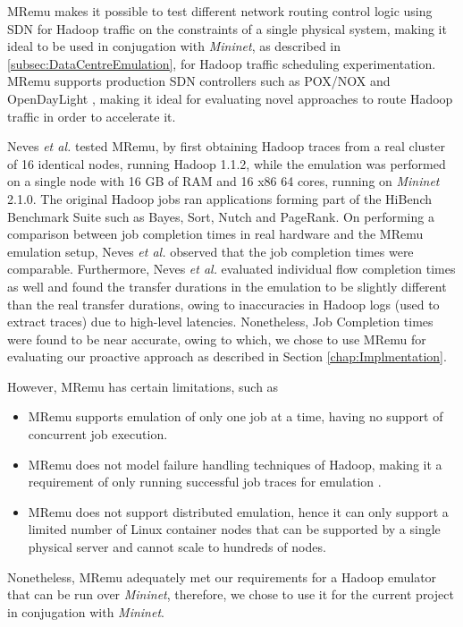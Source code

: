 MRemu makes it possible to test different network routing control logic using SDN for Hadoop traffic on the constraints of a single physical system, making it ideal to be used in conjugation with \textit{Mininet}, as described in \ref{subsec:DataCentreEmulation}, for Hadoop traffic scheduling experimentation. MRemu supports production SDN controllers such as POX/NOX \cite{gude2008nox} and OpenDayLight \cite{ODL2016}, making it ideal for evaluating novel approaches to route Hadoop traffic in order to accelerate it. 

Neves \textit{et al.}  \cite{neves2015mremu} tested MRemu, by first obtaining Hadoop traces from a real cluster of 16 identical nodes, running Hadoop 1.1.2, while the emulation was performed on a single node with 16 GB of RAM and 16 x86 64 cores, running on \textit{Mininet} 2.1.0. The original Hadoop jobs ran applications forming part of the HiBench Benchmark Suite \cite{huang2011hibench} such as Bayes, Sort, Nutch and PageRank. On performing a comparison between job completion times in real hardware and the MRemu emulation setup, Neves \textit{et al.} observed that the job completion times were comparable. Furthermore, Neves \textit{et al.} evaluated individual flow completion times as well and found the transfer durations in the emulation to be slightly different than the real transfer durations, owing to inaccuracies in Hadoop logs (used to extract traces) due to high-level latencies. Nonetheless, Job Completion times were found to be near accurate, owing to which, we chose to use MRemu for evaluating our proactive approach as described in Section \ref{chap:Implmentation}. 

However, MRemu has certain limitations, such as 

\begin{itemize}
\item MRemu supports emulation of only one job at a time, having no support of concurrent job execution. 
\item MRemu does not model failure handling techniques of Hadoop, making it a requirement of only running successful job traces for emulation \cite{neves2015mremu}.
\item MRemu does not support distributed emulation, hence it can only support a limited number of Linux container nodes that can be supported by a single physical server and cannot scale to hundreds of nodes. 
\end{itemize}

Nonetheless, MRemu adequately met our requirements for a Hadoop emulator that can be run over \textit{Mininet}, therefore, we chose to use it for the current project in conjugation with \textit{Mininet}.
 

